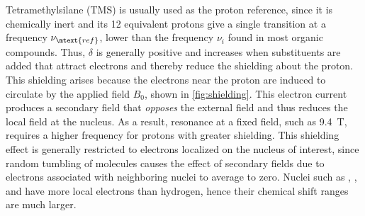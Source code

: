 Tetramethylsilane (TMS) is usually used as the proton reference, since it is chemically inert and its 12 equivalent protons give a single transition at a frequency \( \nu_\mtext{ref} \), lower than the frequency \( \nu_i \) found in most organic compounds. 
Thus, \( \delta \) is generally positive and increases when substituents are added that attract electrons and thereby reduce the shielding about the proton. 
This shielding arises because the electrons near the proton are induced to circulate by the applied field \( B_0 \), shown in \cref{fig:shielding}. 
This electron current produces a secondary field that \emph{opposes} the external field and thus reduces the local field at the nucleus. 
As a result, resonance at a fixed field, such as \SI{9.4}{\tesla}, requires a higher frequency for protons with greater shielding. 
This shielding effect is generally restricted to electrons localized on the nucleus of interest, since random tumbling of molecules causes the effect of secondary fields due to electrons associated with neighboring nuclei to average to zero. 
Nuclei such as , , and  have more local electrons than hydrogen, hence their chemical shift ranges are much larger. 

